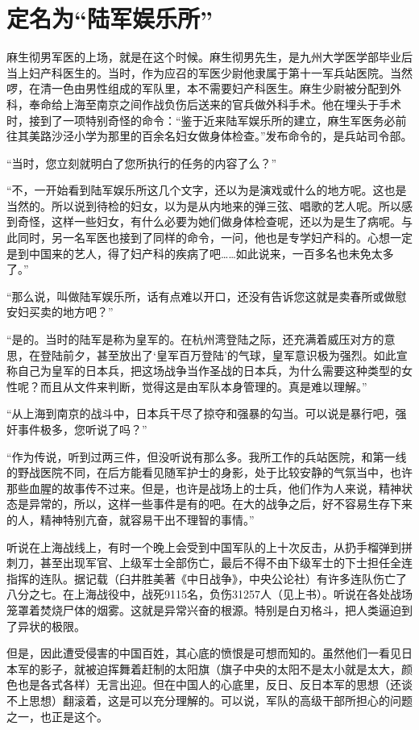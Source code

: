 \documentclass[12pt,UTF8]{ctexbook}
\begin{document}
\section{定名为“陆军娱乐所”}

麻生彻男军医的上场，就是在这个时候。麻生彻男先生，是九州大学医学部毕业后当上妇产科医生的。当时，作为应召的军医少尉他隶属于第十一军兵站医院。当然啰，在清一色由男性组成的军队里，本不需要妇产科医生。麻生少尉被分配到外科，奉命给上海至南京之间作战负伤后送来的官兵做外科手术。他在埋头于手术时，接到了一项特别奇怪的命令：“鉴于近来陆军娱乐所的建立，麻生军医务必前往其美路沙泾小学为那里的百余名妇女做身体检查。”发布命令的，是兵站司令部。

“当时，您立刻就明白了您所执行的任务的内容了么？”

“不，一开始看到陆军娱乐所这几个文字，还以为是演戏或什么的地方呢。这也是当然的。所以说到待检的妇女，以为是从内地来的弹三弦、唱歌的艺人呢。所以感到奇怪，这样一些妇女，有什么必要为她们做身体检查呢，还以为是生了病呢。与此同时，另一名军医也接到了同样的命令，一问，他也是专学妇产科的。心想一定是到中国来的艺人，得了妇产科的疾病了吧……如此说来，一百多名也未免太多了。”

“那么说，叫做陆军娱乐所，话有点难以开口，还没有告诉您这就是卖春所或做慰安妇买卖的地方吧？”

“是的。当时的陆军是称为皇军的。在杭州湾登陆之际，还充满着威压对方的意思，在登陆前夕，甚至放出了‘皇军百万登陆’的气球，皇军意识极为强烈。如此宣称自己为皇军的日本兵，把这场战争当作圣战的日本兵，为什么需要这种类型的女性呢？而且从文件来判断，觉得这是由军队本身管理的。真是难以理解。”

“从上海到南京的战斗中，日本兵干尽了掠夺和强暴的勾当。可以说是暴行吧，强奸事件极多，您听说了吗？”

“作为传说，听到过两三件，但没听说有那么多。我所工作的兵站医院，和第一线的野战医院不同，在后方能看见随军护士的身影，处于比较安静的气氛当中，也许那些血腥的故事传不过来。但是，也许是战场上的士兵，他们作为人来说，精神状态是异常的，所以，这样一些事件是有的吧。在大的战争之后，好不容易生存下来的人，精神特别亢奋，就容易干出不理智的事情。”

听说在上海战线上，有时一个晚上会受到中国军队的上十次反击，从扔手榴弹到拼刺刀，甚至出现军官、上级军士全部伤亡，最后不得不由下级军士的下士担任全连指挥的连队。据记载（臼井胜美著《中日战争》，中央公论社）有许多连队伤亡了八分之七。在上海战役中，战死9115名，负伤31257人（见上书）。听说在各处战场笼罩着焚烧尸体的烟雾。这就是异常兴奋的根源。特别是白刃格斗，把人类逼迫到了异状的极限。

但是，因此遭受侵害的中国百姓，其心底的愤恨是可想而知的。虽然他们一看见日本军的影子，就被迫挥舞着赶制的太阳旗（旗子中央的太阳不是太小就是太大，颜色也是各式各样）无言出迎。但在中国人的心底里，反日、反日本军的思想（还谈不上思想）翻滚着，这是可以充分理解的。可以说，军队的高级干部所担心的问题之一，也正是这个。
\end{document}

